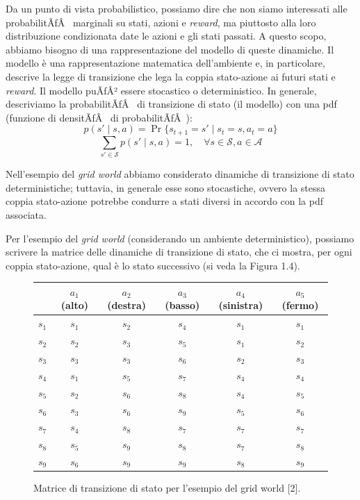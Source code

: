 ﻿\documentclass[11pt, a4paper]{report}
\begin{document}
Da un punto di vista probabilistico, possiamo dire che non siamo interessati alle probabilitÃƒÂ  marginali su stati, azioni e \emph{reward}, ma piuttosto alla loro distribuzione condizionata date le azioni e gli stati passati. A questo scopo, abbiamo bisogno di una rappresentazione del modello di queste dinamiche. Il modello è una rappresentazione matematica dell'ambiente e, in particolare, descrive la legge di transizione che lega la coppia stato-azione ai futuri stati e \emph{reward}. Il modello puÃƒÂ² essere stocastico o deterministico. In generale, descriviamo la probabilitÃƒÂ  di transizione di stato (il modello) con una pdf (funzione di densitÃƒÂ  di probabilitÃƒÂ ):
\begin{equation}
p(s' \mid s, a) = \Pr\{s_{t+1} = s' \mid s_t = s, a_t = a\}
\end{equation}
\begin{equation*}
\sum_{s' \in \mathcal{S}} p(s' \mid s, a) = 1, \quad \forall s \in \mathcal{S}, a \in \mathcal{A}
\end{equation*}

Nell'esempio del \emph{grid world} abbiamo considerato dinamiche di transizione di stato deterministiche; tuttavia, in generale esse sono stocastiche, ovvero la stessa coppia stato-azione potrebbe condurre a stati diversi in accordo con la pdf associata.

Per l'esempio del \emph{grid world} (considerando un ambiente deterministico), possiamo scrivere la matrice delle dinamiche di transizione di stato, che ci mostra, per ogni coppia stato-azione, qual è lo stato successivo (si veda la Figura 1.4).

\begin{figure}[H]
\centering
\begin{tabular}{c|ccccc}
\toprule
& $a_1$ (alto) & $a_2$ (destra) & $a_3$ (basso) & $a_4$ (sinistra) & $a_5$ (fermo) \\ \midrule
$s_1$ & $s_1$ & $s_2$ & $s_4$ & $s_1$ & $s_1$ \\
$s_2$ & $s_2$ & $s_3$ & $s_5$ & $s_1$ & $s_2$ \\
$s_3$ & $s_3$ & $s_3$ & $s_6$ & $s_2$ & $s_3$ \\
$s_4$ & $s_1$ & $s_5$ & $s_7$ & $s_4$ & $s_4$ \\
$s_5$ & $s_2$ & $s_6$ & $s_8$ & $s_4$ & $s_5$ \\
$s_6$ & $s_3$ & $s_6$ & $s_9$ & $s_5$ & $s_6$ \\
$s_7$ & $s_4$ & $s_8$ & $s_7$ & $s_7$ & $s_7$ \\
$s_8$ & $s_5$ & $s_9$ & $s_8$ & $s_7$ & $s_8$ \\
$s_9$ & $s_6$ & $s_9$ & $s_9$ & $s_8$ & $s_9$ \\
\bottomrule
\end{tabular}
\caption{Matrice di transizione di stato per l'esempio del grid world [2].}
\end{figure}
\end{document}
